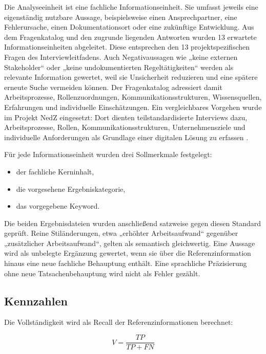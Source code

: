 \documentclass[
  10pt,
  ngerman,
  a4paper,
  toc=graduated,
  numbers=noenddot,
  headings=standardclasses,
  nonumberlist
]{scrartcl}
\begin{document}
Die Analyseeinheit ist eine fachliche Informationseinheit. Sie umfasst jeweils eine eigenständig nutzbare Aussage, beispielsweise einen Ansprechpartner, eine Fehlerursache, einen Dokumentationsort oder eine zukünftige Entwicklung. Aus dem Fragenkatalog und den zugrunde liegenden Antworten wurden 13 erwartete Informationseinheiten abgeleitet. Diese entsprechen den 13 projektspezifischen Fragen des Interviewleitfadens. Auch Negativaussagen wie „keine externen Stakeholder“ oder „keine undokumentierten Regeltätigkeiten“ werden als relevante Information gewertet, weil sie Unsicherheit reduzieren und eine spätere erneute Suche vermeiden können. Der Fragenkatalog adressiert damit Arbeitsprozesse, Rollenzuordnungen, Kommunikationsstrukturen, Wissensquellen, Erfahrungen und individuelle Einschätzungen. Ein vergleichbares Vorgehen wurde im Projekt NedZ eingesetzt: Dort dienten teilstandardisierte Interviews dazu, Arbeitsprozesse, Rollen, Kommunikationsstrukturen, Unternehmensziele und individuelle Anforderungen als Grundlage einer digitalen Lösung zu erfassen \cite[S.~10--11]{boehme_nedz_2023}.

Für jede Informationseinheit wurden drei Sollmerkmale festgelegt:

\begin{itemize}
\item der fachliche Kerninhalt,
\item die vorgesehene Ergebniskategorie,
\item das vorgegebene Keyword.
\end{itemize}

Die beiden Ergebnisdateien wurden anschließend satzweise gegen diesen Standard geprüft. Reine Stiländerungen, etwa „erhöhter Arbeitsaufwand“ gegenüber „zusätzlicher Arbeitsaufwand“, gelten als semantisch gleichwertig. Eine Aussage wird als unbelegte Ergänzung gewertet, wenn sie über die Referenzinformation hinaus eine neue fachliche Behauptung enthält. Eine sprachliche Präzisierung ohne neue Tatsachenbehauptung wird nicht als Fehler gezählt.

\subsection{Kennzahlen}

Die Vollständigkeit wird als Recall der Referenzinformationen berechnet:

\begin{equation}
V = \frac{TP}{TP + FN}
\end{equation}
\end{document}
